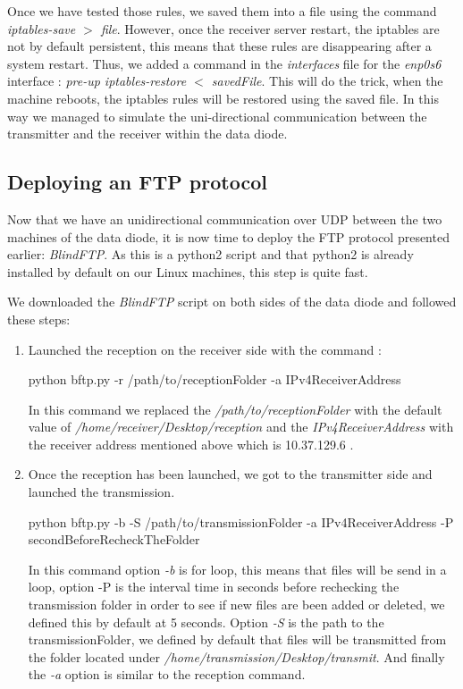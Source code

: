 \documentclass[a4paper,10pt]{article}
\begin{document}
Once we have tested those rules, we saved them into a file using the command \emph{iptables-save $>$ file}. However, once the receiver server restart, the iptables are not by default persistent, this means that these rules are disappearing after a system restart. Thus, we added a command in the \emph{interfaces} file for the \emph{enp0s6} interface : \emph{pre-up iptables-restore $<$ savedFile}. This will do the trick, when the machine reboots, the iptables rules will be restored using the saved file. In this way we managed to simulate the uni-directional communication between the transmitter and the receiver within the data diode.

\subsection{Deploying an FTP protocol}
Now that we have an unidirectional communication over UDP between the two machines of the data diode, it is now time to deploy the FTP protocol presented earlier: \emph{BlindFTP}. As this is a python2 script and that python2 is already installed by default on our Linux machines, this step is quite fast.

We downloaded the \emph{BlindFTP} script on both sides of the data diode and followed these steps:
\begin{enumerate}
\item Launched the reception on the receiver side with the command : 
\begin{center}
python bftp.py -r /path/to/receptionFolder -a IPv4ReceiverAddress
\end{center}
In this command we replaced the \emph{/path/to/receptionFolder} with the default value of \emph{/home/receiver/Desktop/reception} and the \emph{IPv4ReceiverAddress} with the receiver address mentioned above which is 10.37.129.6 .

\item Once the reception has been launched, we got to the transmitter side and launched the transmission.
\begin{center}
python bftp.py -b -S /path/to/transmissionFolder -a IPv4ReceiverAddress -P secondBeforeRecheckTheFolder
\end{center}
In this command option \emph{-b} is for loop, this means that files will be send in a loop, option -P is the interval time in seconds before rechecking the transmission folder in order to see if new files are been added or deleted, we defined this by default at 5 seconds. Option \emph{-S} is the path to the transmissionFolder, we defined by default that files will be transmitted from the folder located under \emph{/home/transmission/Desktop/transmit}. And finally the \emph{-a} option is similar to the reception command.
\end{enumerate}
\end{document}

